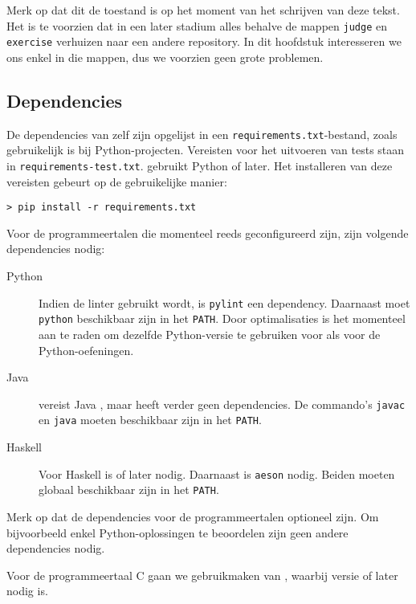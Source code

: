 \inputminted{text}{code/dirs-tested.txt}

Merk op dat dit de toestand is op het moment van het schrijven van deze tekst.
Het is te voorzien dat in een later stadium alles behalve de mappen \texttt{judge} en \texttt{exercise} verhuizen naar een andere repository.
In dit hoofdstuk interesseren we ons enkel in die mappen, dus we voorzien geen grote problemen.

\subsection{Dependencies}\label{subsec:dependencies}

De dependencies van \tested{} zelf zijn opgelijst in een \texttt{requirements.txt}-bestand, zoals gebruikelijk is bij Python-projecten.
Vereisten voor het uitvoeren van tests staan in \texttt{requirements-test.txt}.
\tested{} gebruikt Python  of later.
Het installeren van deze vereisten gebeurt op de gebruikelijke manier:

\begin{verbatim}
> pip install -r requirements.txt
\end{verbatim}

Voor de programmeertalen die momenteel reeds geconfigureerd zijn, zijn volgende dependencies nodig:

\begin{description}
    \item[Python] Indien de linter gebruikt wordt, is \texttt{pylint} een dependency.
    Daarnaast moet \texttt{python} beschikbaar zijn in het \texttt{PATH}.
    Door optimalisaties is het momenteel aan te raden om dezelfde Python-versie te gebruiken voor \tested{} als voor de Python-oefeningen.
    \item[Java] \tested{} vereist Java , maar heeft verder geen dependencies.
    De commando's \texttt{javac} en \texttt{java} moeten beschikbaar zijn in het \texttt{PATH}.
    \item[Haskell] Voor Haskell is   of later nodig.
    Daarnaast is \texttt{aeson} nodig.
    Beiden moeten globaal beschikbaar zijn in het \texttt{PATH}.
\end{description}

Merk op dat de dependencies voor de programmeertalen optioneel zijn.
Om bijvoorbeeld enkel Python-oplossingen te beoordelen zijn geen andere dependencies nodig.

Voor de programmeertaal C gaan we gebruikmaken van , waarbij versie  of later nodig is.

